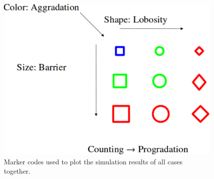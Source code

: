 \begin{figure}
  \centering
  \includegraphics[width=0.65 \linewidth]{./figurer/codes} 
  \caption{Marker codes used to plot the simulation results of all cases
together.}
  \label{fig:STL_1}
%
\end{figure}





